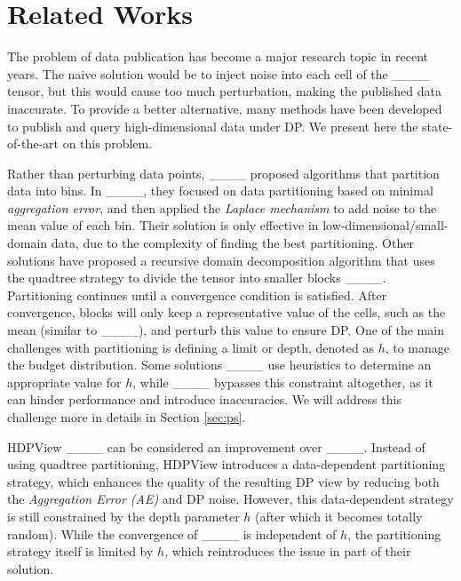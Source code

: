\section{Related Works}
\label{sec:rw}
The problem of data publication has become a major research topic in recent years. The naive solution would be to inject noise into each cell of the ____ tensor, but this would cause too much perturbation, making the published data inaccurate. 
To provide a better alternative, many methods have been developed to publish and query high-dimensional data under DP. We present here the state-of-the-art on this problem.\medskip

Rather than perturbing data points, ____ proposed algorithms that partition data into bins. In ____, they focused on data partitioning based on minimal \textit{aggregation error}, and then applied the \textit{Laplace mechanism} to add noise to the mean value of each bin. Their solution is only effective in low-dimensional/small-domain data, due to the complexity of finding the best partitioning. 
Other solutions have proposed a recursive domain decomposition algorithm that uses the quadtree strategy to divide the tensor into smaller blocks ____. 
Partitioning continues until a convergence condition is satisfied. After convergence, blocks will only keep a representative value of the cells, such as the mean (similar to ____), and perturb this value to ensure DP. 
One of the main challenges with partitioning is defining a limit or depth, denoted as $h$, to manage the budget distribution. Some solutions ____ use heuristics to determine an appropriate value for $h$, while ____ bypasses this constraint altogether, as it can hinder performance and introduce inaccuracies. We will address this challenge more in details in Section \ref{sec:ps}.

HDPView ____ can be considered an improvement over ____. Instead of using quadtree partitioning, HDPView introduces a data-dependent partitioning strategy, which enhances the quality of the resulting DP view by reducing both the \textit{Aggregation Error (AE)} and DP noise. However, this data-dependent strategy is still constrained by the depth parameter $h$ (after which it becomes totally random). While the convergence of ____ is independent of $h$, the partitioning strategy itself is limited by $h$, which reintroduces the issue in part of their solution.

